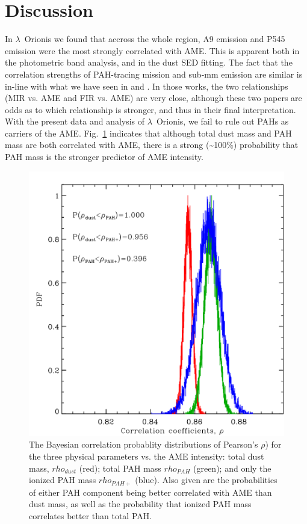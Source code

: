   \section{Discussion}
  \label{sec:lori_discussion}
      In  $\lambda$~Orionis we found that accross the whole region, A9 emission and P545 emission were the most strongly correlated with AME. This is apparent both in the photometric band analysis, and in the dust SED fitting.  The fact that the correlation strengths of PAH-tracing mission and sub-mm emission are similar is in-line with what we have seen in \cite{ysard10b} and \cite{hensley16}. In those works, the two relationships (MIR vs. AME and FIR vs. AME) are very close, although these two papers are odds as to which relationship is stronger, and thus in their final interpretation. With the present data and analysis of $\lambda$~Orionis, we fail to rule out PAHs as carriers of the AME. Fig.~\ref{fig:fred_LOri_notes_Oct2017_fig2c} indicates that although total dust mass and PAH mass are both correlated with AME, there is a strong (\textasciitilde{}100\%) probability that PAH mass is the stronger predictor of AME intensity.
          \begin{figure}
            \includegraphics[width=\textwidth]{../Plots/ch_lori/fred_LOri_notes_Oct2017_fig2c.pdf}
            \centering
            \caption{ The Bayesian correlation probablity distributions of Pearson's $\rho{}$) for the three physical parameters vs. the AME intensity: total dust mass, $rho_{dust}$ (red); total PAH mass $rho_{PAH}$ (green); and only the ionized PAH mass $rho_{PAH+}$ (blue). Also given are the probabilities of either PAH component being better correlated with AME than dust mass, as well as the probability that ionized PAH mass correlates better than total PAH.}
            \label{fig:fred_LOri_notes_Oct2017_fig2c}
          \end{figure}
